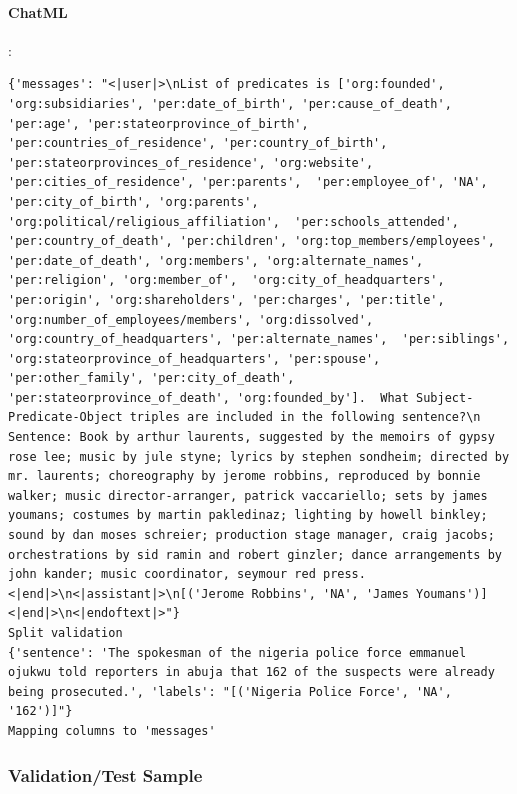 \documentclass{article}
\begin{document}
\paragraph{ChatML}:
\begin{lstlisting}
{'messages': "<|user|>\nList of predicates is ['org:founded', 'org:subsidiaries', 'per:date_of_birth', 'per:cause_of_death',  'per:age', 'per:stateorprovince_of_birth', 'per:countries_of_residence', 'per:country_of_birth',  'per:stateorprovinces_of_residence', 'org:website', 'per:cities_of_residence', 'per:parents',  'per:employee_of', 'NA', 'per:city_of_birth', 'org:parents', 'org:political/religious_affiliation',  'per:schools_attended', 'per:country_of_death', 'per:children', 'org:top_members/employees',  'per:date_of_death', 'org:members', 'org:alternate_names', 'per:religion', 'org:member_of',  'org:city_of_headquarters', 'per:origin', 'org:shareholders', 'per:charges', 'per:title',  'org:number_of_employees/members', 'org:dissolved', 'org:country_of_headquarters', 'per:alternate_names',  'per:siblings', 'org:stateorprovince_of_headquarters', 'per:spouse', 'per:other_family', 'per:city_of_death',  'per:stateorprovince_of_death', 'org:founded_by'].  What Subject-Predicate-Object triples are included in the following sentence?\n Sentence: Book by arthur laurents, suggested by the memoirs of gypsy rose lee; music by jule styne; lyrics by stephen sondheim; directed by mr. laurents; choreography by jerome robbins, reproduced by bonnie walker; music director-arranger, patrick vaccariello; sets by james youmans; costumes by martin pakledinaz; lighting by howell binkley; sound by dan moses schreier; production stage manager, craig jacobs; orchestrations by sid ramin and robert ginzler; dance arrangements by john kander; music coordinator, seymour red press.<|end|>\n<|assistant|>\n[('Jerome Robbins', 'NA', 'James Youmans')]<|end|>\n<|endoftext|>"}
Split validation
{'sentence': 'The spokesman of the nigeria police force emmanuel ojukwu told reporters in abuja that 162 of the suspects were already being prosecuted.', 'labels': "[('Nigeria Police Force', 'NA', '162')]"}
Mapping columns to 'messages'
\end{lstlisting}
\subsubsection{Validation/Test Sample}
\end{document}
